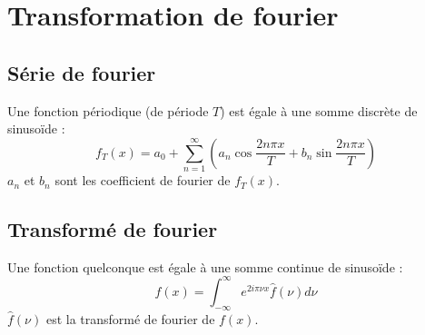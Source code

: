 
\chapter{Transformation de fourier}

\section{Série de fourier}
%
Une fonction périodique (de période $T$) est égale à une somme discrète de sinusoïde :
\[
f_T(x)=a_0 + \sum_{n=1}^\infty \left( a_n \cos \frac{2 n \pi x}{T} + b_n \sin \frac{2 n \pi x}{T} \right)
\]
$a_n$ et $b_n$ sont les coefficient de fourier de $f_T(x)$.

\section{Transformé de fourier}
%
Une fonction quelconque est égale à une somme continue de sinusoïde :
\[
f(x) = \int_{-\infty}^\infty e^{2 i \pi \nu x}\widehat{f}(\nu) d\nu
\]
$\widehat{f}(\nu)$ est la transformé de fourier de $f(x)$.

